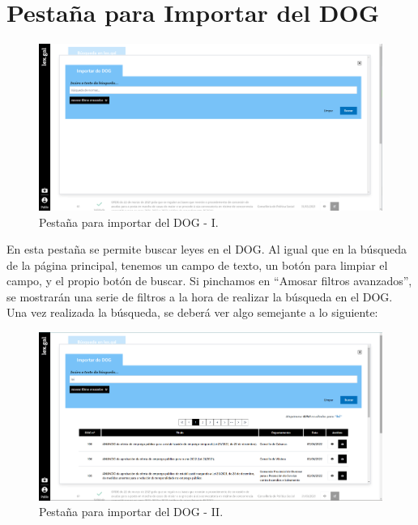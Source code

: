 \section{Pestaña para Importar del DOG}
\label{PBusquedaDOG}

\begin{figure}[H]
\centerline{\includegraphics[width=15cm]{figuras/manualUsuario/BuscarDOG.PNG}}
\caption{Pestaña para importar del DOG - I.}
\label{enlacePBusquedaDOG}
\end{figure}

En esta pestaña se permite buscar leyes en el DOG. Al igual que en la búsqueda de la página principal, tenemos un campo de texto, un botón para limpiar el campo, y el propio botón de buscar. Si pinchamos en ``Amosar filtros avanzados'', se mostrarán una serie de filtros a la hora de realizar la búsqueda en el DOG.
\\

Una vez realizada la búsqueda, se deberá ver algo semejante a lo siguiente:

\begin{figure}[H]
\centerline{\includegraphics[width=15cm]{figuras/manualUsuario/BuscarDOGCompleta.PNG}}
\caption{Pestaña para importar del DOG - II.}
\label{enlacePBusquedaCDOG}
\end{figure}

